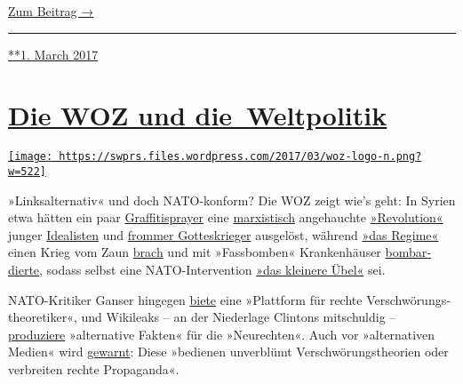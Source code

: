 \href{https://swprs.org/die-republik-und-das-imperium/}{Zum Beitrag →}

\begin{center}\rule{0.5\linewidth}{\linethickness}\end{center}

\href{https://swprs.org/2017/03/01/die-republik-und-das-imperium/}{**1.
March 2017}

\hypertarget{die-woz-und-die-weltpolitik}{%
\section{\texorpdfstring{\href{https://swprs.org/2017/03/01/die-woz-und-die-weltpolitik/}{Die
WOZ und
die~Weltpolitik}}{Die WOZ und die~Weltpolitik}}\label{die-woz-und-die-weltpolitik}}

\href{https://swprs.org/2017/03/01/die-woz-und-die-weltpolitik/}{\texttt{[image: https://swprs.files.wordpress.com/2017/03/woz-logo-n.png?w=522]}}

»Linksalternativ« und doch NATO-konform? Die WOZ zeigt wie's geht: In
Syrien etwa hätten ein paar
\href{https://www.woz.ch/1203/syrien/assad-geht-das-licht-aus}{Graffiti­sprayer}
eine
\href{https://www.woz.ch/1616/syriens-zukunft/assads-spiel-mit-dem-westen}{marxis­tisch}
ange­hauchte
\href{https://www.woz.ch/1511/kommentar-von-francois-moore/die-revolution-in-syrien-ist-am-ende}{»Revo­lution«}
junger
\href{https://www.woz.ch/1606/syrien/mithilfe-dieser-verdammten-russen-wird-dieser-bastard-noch-ueberleben}{Idealisten}
und \href{https://www.woz.ch/1235/syrien/kaempfen-und-beten}{frommer
Gottes­krieger} ausgelöst, während
\href{https://www.woz.ch/1324/syrien/ein-land-zersplittert-immer-mehr}{»das
Regime«} einen Krieg vom Zaun
\href{https://www.woz.ch/1321/syrien-und-der-westen/assad-kann-nur-gewinnen}{brach}
und mit »Fass­bomben« Kranken­häuser
\href{https://www.woz.ch/1416/syrien/fassbomben-gottes-wille-und-demokratie}{bombar­dierte},
sodass selbst eine NATO-Inter­vention
\href{https://www.woz.ch/1335/syrien/intervention-als-kleineres-uebel}{»das
kleinere Übel«} sei.

NATO-Kritiker Ganser hingegen
\href{https://www.woz.ch/1703/wahrheit-und-verschwoerung/das-ganser-phaenomen}{biete}
eine »Plattform für rechte Ver­schwö­rungs­theo­retiker«, und Wiki­leaks
-- an der Nieder­lage Clintons mitschuldig --
\href{https://www.woz.ch/1711/cia-dokumente/die-alternativen-fakten-von-wikileaks}{produziere}
»alter­native Fakten« für die »Neurechten«. Auch vor »alter­na­tiven
Medien« wird
\href{https://www.woz.ch/1743/qualitaet-der-medien/unterinformiert-und-ausgeliefert}{gewarnt}:
Diese »bedienen unverblümt Ver­schwörungs­theorien oder ver­breiten
rechte Propaganda«.

